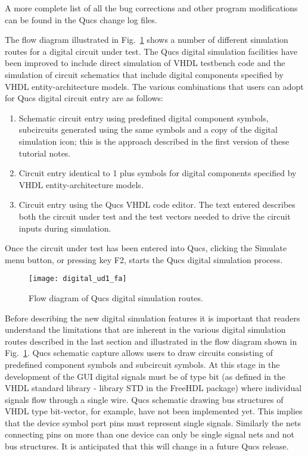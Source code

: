 A more complete list of all the bug corrections and other program
modifications can be found in the Qucs change log files.


The flow diagram illustrated in Fig.~\ref{fig:digital_ud1_fa} shows a
number of different simulation routes for a digital circuit under
test.  The Qucs digital simulation facilities have been improved to
include direct simulation of VHDL testbench code and the simulation of
circuit schematics that include digital components specified by VHDL
entity-architecture models.  The various combinations that users can
adopt for Qucs digital circuit entry are as follows:

\begin{enumerate}
\item Schematic circuit entry using predefined digital component symbols, subcircuits generated using the same symbols and a copy of the digital simulation icon; this is the approach described in the first version of these tutorial notes.
\item Circuit entry identical to 1 plus symbols for digital components specified by VHDL entity-architecture models.
\item Circuit entry using the Qucs VHDL code editor. The text entered describes both the circuit under test and the test vectors needed to drive the circuit inputs during simulation. 
\end{enumerate}
Once the circuit under test has been entered into Qucs, clicking the
Simulate menu button, or pressing key F2, starts the Qucs digital
simulation process.

\begin{figure}
  \centering
  \texttt{[image: digital\_ud1\_fa]}
  \caption{Flow diagram of Qucs digital simulation routes.}
  \label{fig:digital_ud1_fa}
\end{figure} 


Before describing the new digital simulation features it is important
that readers understand the limitations that are inherent in the
various digital simulation routes described in the last section and
illustrated in the flow diagram shown in
Fig.~\ref{fig:digital_ud1_fa}.  Qucs schematic capture allows users to
draw circuits consisting of predefined component symbols and
subcircuit symbols.  At this stage in the development of the GUI
digital signals must be of type bit (as defined in the VHDL standard
library - library STD in the FreeHDL package) where individual signals
flow through a single wire.  Qucs schematic drawing bus structures of
VHDL type bit-vector, for example, have not been implemented yet.
This implies that the device symbol port pins must represent single
signals.  Similarly the nets connecting pins on more than one device
can only be single signal nets and not bus structures.  It is
anticipated that this will change in a future Qucs release.

